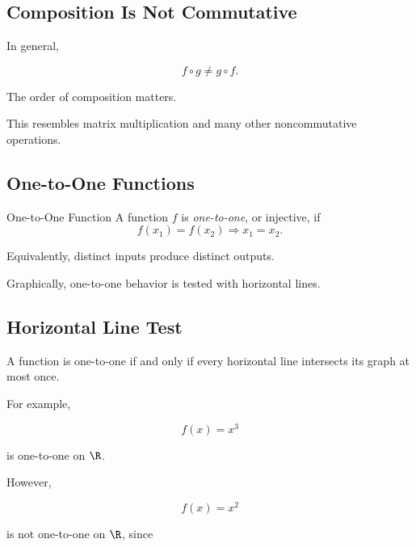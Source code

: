 \subsection{Composition Is Not Commutative}
\label{subsec:composition-not-commutative}

In general,

\[ f\circ g\neq g\circ f. \]

The order of composition matters.

This resembles matrix multiplication and many other noncommutative
operations.

\subsection{One-to-One Functions}
\label{subsec:one-to-one-analysis}

\begin{definitionbox}{One-to-One Function}
A function \(f\) is \emph{one-to-one}, or injective, if
\[ f(x_1)=f(x_2)\Longrightarrow x_1=x_2. \]
\end{definitionbox}

Equivalently, distinct inputs produce distinct outputs.

Graphically, one-to-one behavior is tested with horizontal lines.

\subsection{Horizontal Line Test}
\label{subsec:horizontal-line-test}

\begin{principle}
A function is one-to-one if and only if every horizontal line intersects
its graph at most once.
\end{principle}

For example,

\[ f(x)=x^3 \]

is one-to-one on \(\R\).

However,

\[ f(x)=x^2 \]

is not one-to-one on \(\R\), since

